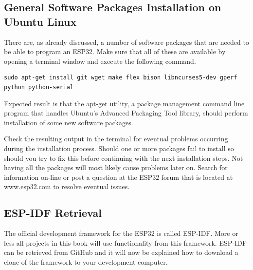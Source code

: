 \documentclass{tufte-book}
\begin{document}
\subsection{General Software Packages Installation on Ubuntu Linux}
There are, as already discussed, a number of software packages that are needed to be able to program an ESP32. Make sure that all of these are available by opening a terminal window and execute the following command. 

	
\begin{lstlisting}
sudo apt-get install git wget make flex bison libncurses5-dev gperf python python-serial
\end{lstlisting}

Expected result is that the apt-get utility, a package management command line program that handles Ubuntu's Advanced Packaging Tool library, should perform installation of some new software packages.
 
Check the resulting output in the terminal for eventual problems occurring during the installation process. Should one or more packages fail to install so should you try to fix this before continuing with the next installation steps. Not having all the packages will most likely cause problems later on. Search for information on-line or post a question at the ESP32 forum that is located at www.esp32.com to resolve eventual issues.

\subsection{ESP-IDF Retrieval}


The official development framework for the ESP32 is called ESP-IDF. More or less all projects in this book will use functionality from this framework. ESP-IDF can be retrieved from GitHub and it will now be explained how to download a clone of the framework to your development computer.
\end{document}
